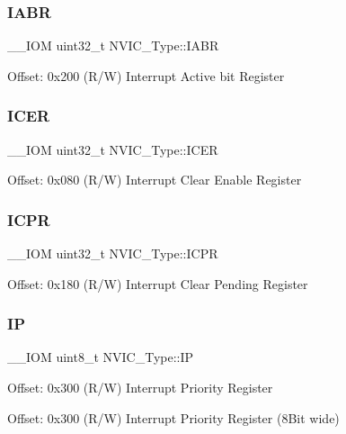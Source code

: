 \subsubsection{\texorpdfstring{I\+A\+BR}{IABR}}
{\footnotesize\ttfamily \+\_\+\+\_\+\+I\+OM uint32\+\_\+t N\+V\+I\+C\+\_\+\+Type\+::\+I\+A\+BR}

Offset\+: 0x200 (R/W) Interrupt Active bit Register \mbox{\label{struct_n_v_i_c___type_aed882e10ea8ee6a915007af71643d7da}} 
\subsubsection{\texorpdfstring{I\+C\+ER}{ICER}}
{\footnotesize\ttfamily \+\_\+\+\_\+\+I\+OM uint32\+\_\+t N\+V\+I\+C\+\_\+\+Type\+::\+I\+C\+ER}

Offset\+: 0x080 (R/W) Interrupt Clear Enable Register \mbox{\label{struct_n_v_i_c___type_aa056e3f59e88845ee47db4a43635b3a2}} 
\subsubsection{\texorpdfstring{I\+C\+PR}{ICPR}}
{\footnotesize\ttfamily \+\_\+\+\_\+\+I\+OM uint32\+\_\+t N\+V\+I\+C\+\_\+\+Type\+::\+I\+C\+PR}

Offset\+: 0x180 (R/W) Interrupt Clear Pending Register \mbox{\label{struct_n_v_i_c___type_a4eef47929a0d1317a107f1ac62e28464}} 
\subsubsection{\texorpdfstring{IP}{IP}\hspace{0.1cm}{\footnotesize\ttfamily [1/2]}}
{\footnotesize\ttfamily \+\_\+\+\_\+\+I\+OM uint8\+\_\+t N\+V\+I\+C\+\_\+\+Type\+::\+IP}

Offset\+: 0x300 (R/W) Interrupt Priority Register

Offset\+: 0x300 (R/W) Interrupt Priority Register (8\+Bit wide) \mbox{\label{struct_n_v_i_c___type_a9a4341692e45d089a113986a3d344e98}} 
